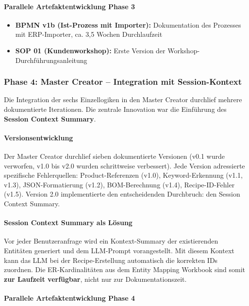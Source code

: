\paragraph{Parallele Artefaktentwicklung Phase 3}

\begin{itemize}
    \item \textbf{BPMN v1b (Ist-Prozess mit Importer):} Dokumentation des Prozesses mit ERP-Importer, ca. 3,5 Wochen Durchlaufzeit
    \item \textbf{SOP 01 (Kundenworkshop):} Erste Version der Workshop-Durchführungsanleitung
\end{itemize}


\subsubsection{Phase 4: Master Creator -- Integration mit Session-Kontext}
\label{subsubsec:Phase4}

Die Integration der sechs Einzellogiken in den Master Creator durchlief mehrere dokumentierte Iterationen. Die zentrale Innovation war die Einführung des \textbf{Session Context Summary}.

\paragraph{Versionsentwicklung}

Der Master Creator durchlief sieben dokumentierte Versionen (v0.1 wurde verworfen, v1.0 bis v2.0 wurden schrittweise verbessert). Jede Version adressierte spezifische Fehlerquellen: Product-Referenzen (v1.0), Keyword-Erkennung (v1.1, v1.3), JSON-Formatierung (v1.2), BOM-Berechnung (v1.4), Recipe-ID-Fehler (v1.5). Version 2.0 implementierte den entscheidenden Durchbruch: den Session Context Summary.

\paragraph{Session Context Summary als Lösung}

Vor jeder Benutzeranfrage wird ein Kontext-Summary der existierenden Entitäten generiert und dem LLM-Prompt vorangestellt. Mit diesem Kontext kann das LLM bei der Recipe-Erstellung automatisch die korrekten IDs zuordnen. Die ER-Kardinalitäten aus dem Entity Mapping Workbook sind somit \textbf{zur Laufzeit verfügbar}, nicht nur zur Dokumentationszeit.

\paragraph{Parallele Artefaktentwicklung Phase 4}


